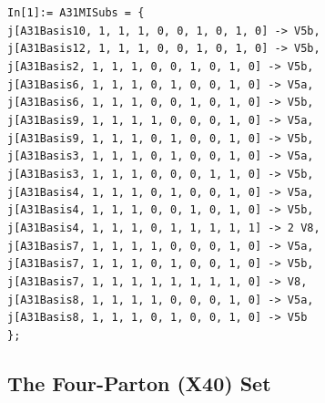 \begin{mdframed}[backgroundcolor=gray!10, linewidth=0pt]
\texttt{In[1]:= A31MISubs = \{\\
   j[A31Basis10, 1, 1, 1, 0, 0, 1, 0, 1, 0] -> V5b,\\
   j[A31Basis12, 1, 1, 1, 0, 0, 1, 0, 1, 0] -> V5b,\\
   j[A31Basis2, 1, 1, 1, 0, 0, 1, 0, 1, 0] -> V5b,\\
   j[A31Basis6, 1, 1, 1, 0, 1, 0, 0, 1, 0] -> V5a,\\
   j[A31Basis6, 1, 1, 1, 0, 0, 1, 0, 1, 0] -> V5b,\\
   j[A31Basis9, 1, 1, 1, 1, 0, 0, 0, 1, 0] -> V5a,\\
   j[A31Basis9, 1, 1, 1, 0, 1, 0, 0, 1, 0] -> V5b,\\
   j[A31Basis3, 1, 1, 1, 0, 1, 0, 0, 1, 0] -> V5a,\\
   j[A31Basis3, 1, 1, 1, 0, 0, 0, 1, 1, 0] -> V5b,\\
   j[A31Basis4, 1, 1, 1, 0, 1, 0, 0, 1, 0] -> V5a,\\
   j[A31Basis4, 1, 1, 1, 0, 0, 1, 0, 1, 0] -> V5b,\\
   j[A31Basis4, 1, 1, 1, 0, 1, 1, 1, 1, 1] -> 2 V8,\\
   j[A31Basis7, 1, 1, 1, 1, 0, 0, 0, 1, 0] -> V5a,\\
   j[A31Basis7, 1, 1, 1, 0, 1, 0, 0, 1, 0] -> V5b,\\
   j[A31Basis7, 1, 1, 1, 1, 1, 1, 1, 1, 0] -> V8,\\
   j[A31Basis8, 1, 1, 1, 1, 0, 0, 0, 1, 0] -> V5a,\\
   j[A31Basis8, 1, 1, 1, 0, 1, 0, 0, 1, 0] -> V5b\\
   \};}
\end{mdframed}

\subsection{The Four-Parton (X40) Set}

